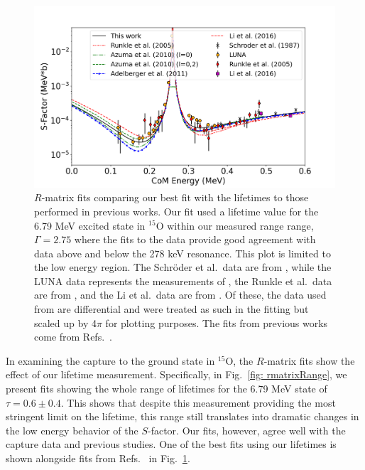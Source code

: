\begin{figure}[h!]
\includegraphics[width=1.0\linewidth]{./figures/bestFits.png}
\caption{$R$-matrix fits comparing our best fit with the lifetimes to those performed in previous works. Our fit used a lifetime value for the 6.79 MeV excited state in $^{15}$O within our measured range range, $\Gamma=2.75$ where the fits to the data provide good agreement with data above and below the 278 keV resonance. This plot is limited to the low energy region. The Schr{\"{o}}der et al.~data are from \cite{Schroder1987}, while the LUNA data represents the measurements of \cite{Formicola2004, Imbriani2005, Marta2008, Marta2011}, the Runkle et al.~data are from \cite{Runkle2005}, and the Li et al.~data are from \cite{Li2016}. Of these, the data used from \citet{Li2016} are differential and were treated as such in the fitting but scaled up by 4$\pi$ for plotting purposes. The fits from previous works come from Refs.~\cite{Runkle2005, Azuma2010, Adelberger2011, Li2016}.}
\label{fig: rmatrixClose}
\end{figure}

In examining the capture to the ground state in $^{15}$O, the $R$-matrix fits show the effect of our lifetime measurement. Specifically, in Fig.~\ref{fig: rmatrixRange}, we present fits showing the whole range of lifetimes for the 6.79 MeV state of $\tau = 0.6 \pm 0.4$. This shows that despite this measurement providing the most stringent limit on the lifetime, this range still translates into dramatic changes in the low energy behavior of the $S$-factor. Our fits, however, agree well with the capture data and previous studies. One of the best fits using our lifetimes is shown alongside fits from Refs.~\cite{Runkle2005, Azuma2010, Adelberger2011, Li2016} in Fig.~\ref{fig: rmatrixClose}. 

